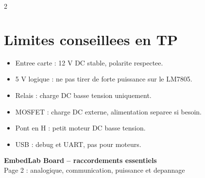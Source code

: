 \documentclass[10pt,a4paper]{article}
\begin{document}
\begin{multicols}{2}
\section*{Limites conseillees en TP}

\begin{itemize}
\item Entree carte : 12 V DC stable, polarite respectee.
\item 5 V logique : ne pas tirer de forte puissance sur le LM7805.
\item Relais : charge DC basse tension uniquement.
\item MOSFET : charge DC externe, alimentation separee si besoin.
\item Pont en H : petit moteur DC basse tension.
\item USB : debug et UART, pas pour moteurs.
\end{itemize}

\end{multicols}

\newpage

\begin{center}
{\Large\bfseries\color{bleuPCB} EmbedLab Board -- raccordements essentiels}\\
{Page 2 : analogique, communication, puissance et depannage}
\end{center}
\end{document}
